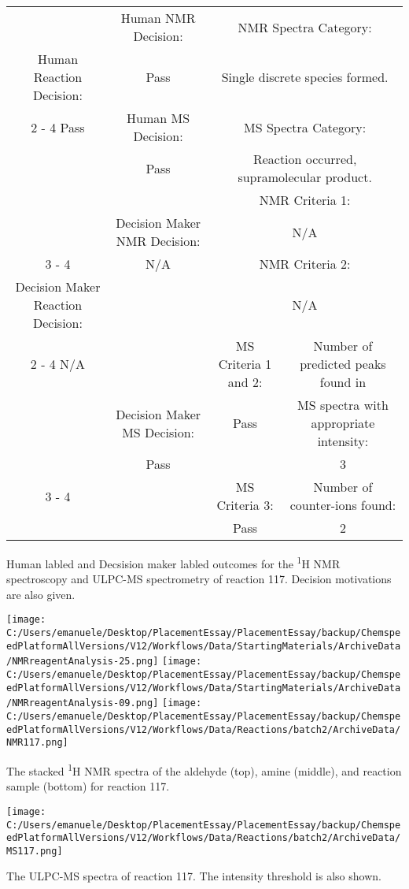 \documentclass{article}%
\begin{document}
\begin{Decision Table}[H]%
\begin{tabular}{|c|c|c|c|}%
\hline%
&Human NMR Decision:&\multicolumn{2}{|c|}{NMR Spectra Category:}\\%
Human Reaction Decision:&Pass&\multicolumn{2}{|c|}{Single discrete species formed.}\\%
\cline{2%
-%
4}%
Pass&Human MS Decision:&\multicolumn{2}{|c|}{MS Spectra Category:}\\%
&Pass&\multicolumn{2}{|c|}{Reaction occurred, supramolecular product.}\\%
\hline%
&&\multicolumn{2}{|c|}{NMR Criteria 1:}\\%
&Decision Maker NMR Decision:&\multicolumn{2}{|c|}{N/A}\\%
\cline{3%
-%
4}%
&N/A&\multicolumn{2}{|c|}{NMR Criteria 2:}\\%
Decision Maker Reaction Decision:&&\multicolumn{2}{|c|}{N/A}\\%
\cline{2%
-%
4}%
N/A&&MS Criteria 1 and 2:&Number of predicted peaks found in\\%
&Decision Maker MS Decision:&Pass&MS spectra with appropriate intensity:\\%
&Pass&&3\\%
\cline{3%
-%
4}%
&&MS Criteria 3:&Number of counter{-}ions found:\\%
&&Pass&2\\%
\hline%
\end{tabular}%
\caption{Human labled and Decsision maker labled outcomes for the \textsuperscript{1}H NMR spectroscopy and ULPC-MS spectrometry of reaction 117. Decision motivations are also given.}%
\end{Decision Table}%
\begin{NMR Spectra}[H]%
\begin{center}%
\texttt{[image: C:/Users/emanuele/Desktop/PlacementEssay/PlacementEssay/backup/ChemspeedPlatformAllVersions/V12/Workflows/Data/StartingMaterials/ArchiveData/NMRreagentAnalysis-25.png]}\hfill%
\texttt{[image: C:/Users/emanuele/Desktop/PlacementEssay/PlacementEssay/backup/ChemspeedPlatformAllVersions/V12/Workflows/Data/StartingMaterials/ArchiveData/NMRreagentAnalysis-09.png]}\hfill%
\texttt{[image: C:/Users/emanuele/Desktop/PlacementEssay/PlacementEssay/backup/ChemspeedPlatformAllVersions/V12/Workflows/Data/Reactions/batch2/ArchiveData/NMR117.png]}\hfill%
\end{center}%
\caption{The stacked \textsuperscript{1}H NMR spectra of the aldehyde (top), amine (middle), and reaction sample (bottom) for reaction 117.}%
\end{NMR Spectra}%
\begin{MS Spectra}[H]%
\begin{center}%
\texttt{[image: C:/Users/emanuele/Desktop/PlacementEssay/PlacementEssay/backup/ChemspeedPlatformAllVersions/V12/Workflows/Data/Reactions/batch2/ArchiveData/MS117.png]}\hfill%
\end{center}%
\caption{The ULPC-MS spectra of reaction 117. The intensity threshold is also shown.}%
\end{MS Spectra}%
\end{document}

